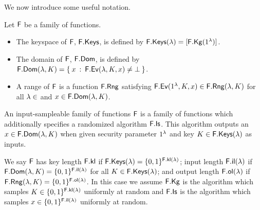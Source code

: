 We now introduce some useful notation.
\begin{defn}
	Let $\mathsf{F}$ be a family of functions.
	\begin{itemize}
		\item The keyspace of $\mathsf{F}$, $\mathsf{F}.\mathsf{Keys}$, is defined by $\mathsf{F}.\mathsf{Keys}(\lambda)=[\mathsf{F}.\mathsf{Kg}(1^\lambda)]$.
		\item The domain of $\mathsf{F}$, $\mathsf{F}.\mathsf{Dom}$, is defined by $\mathsf{F}.\mathsf{Dom}(\lambda,K)=\{\:x \: :\: \mathsf{F}.\mathsf{Ev}(\lambda,K,x)\neq\bot\:\}$.
		\item A range of $\mathsf{F}$ is a function $\mathsf{F}.\mathsf{Rng}$ satisfying $\mathsf{F}.\mathsf{Ev}(1^\lambda,K,x)\in\mathsf{F}.\mathsf{Rng}(\lambda,K)$ for all $\lambda\in$ and $x\in\mathsf{F}.\mathsf{Dom}(\lambda,K)$.
	\end{itemize}
\end{defn}

\begin{defn}
	An input-sampleable family of functions $\mathsf{F}$ is a family of functions which additionally specifies a randomized algorithm $\mathsf{F}.\mathsf{Is}$.
	This algorithm outputs an $x\in\mathsf{F}.\mathsf{Dom}(\lambda,K)$ when given security parameter $1^\lambda$ and key $K\in\mathsf{F}.\mathsf{Keys}(\lambda)$ as inputs.  
\end{defn}

We say $\mathsf{F}$ has key length $\mathsf{F}.\mathsf{kl}$ if $\mathsf{F}.\mathsf{Keys}(\lambda)=\{0,1\}^{\mathsf{F}.\mathsf{kl}(\lambda)}$;
input length $\mathsf{F}.\mathsf{il}(\lambda)$ if $\mathsf{F}.\mathsf{Dom}(\lambda,K)=\{0,1\}^{\mathsf{F}.\mathsf{il}(\lambda)}$ for all $K\in\mathsf{F}.\mathsf{Keys}(\lambda)$;
and
output length $\mathsf{F}.\mathsf{ol}(\lambda)$ if $\mathsf{F}.\mathsf{Rng}(\lambda,K)=\{0,1\}^{\mathsf{F}.\mathsf{ol}(\lambda)}$.
In this case we assume $\mathsf{F}.\mathsf{Kg}$ is the algorithm which samples $K\in\{0,1\}^{\mathsf{F}.\mathsf{kl}(\lambda)}$ uniformly at random and $\mathsf{F}.\mathsf{Is}$ is the algorithm which samples $x\in\{0,1\}^{\mathsf{F}.\mathsf{il}(\lambda)}$ uniformly at random. 